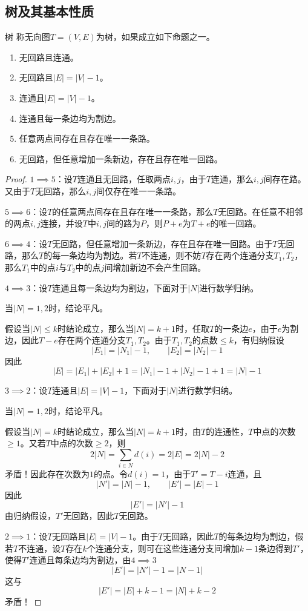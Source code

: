 \documentclass[lang = cn, scheme = chinese, thmcnt = section]{elegantbook}
\begin{document}
\subsection{树及其基本性质}

\begin{definition}{树}
	称无向图$T=(V,E)$为树，如果成立如下命题之一。
	\begin{enumerate}
		\item 无回路且连通。
		\item 无回路且$|E|=|V|-1$。
		\item 连通且$|E|=|V|-1$。
		\item 连通且每一条边均为割边。
		\item 任意两点间存在且存在唯一一条路。
		\item 无回路，但任意增加一条新边，存在且存在唯一回路。
	\end{enumerate}
\end{definition}

\begin{proof}
	$1\implies 5$：设$T$连通且无回路，任取两点$i,j$，由于$T$连通，那么$i,j$间存在路。又由于$T$无回路，那么$i,j$间仅存在唯一一条路。
	
	$5\implies 6$：设$T$的任意两点间存在且存在唯一一条路，那么$T$无回路。在任意不相邻的两点$i,j$连接，并设$T$中$i,j$间的路为$P$，则$P+e$为$T+e$的唯一回路。
	
	$6\implies 4$：设$T$无回路，但任意增加一条新边，存在且存在唯一回路。由于$T$无回路，那么$T$的每一条边均为割边。若$T$不连通，则不妨$T$存在两个连通分支$T_1,T_2$，那么$T_1$中的点$i$与$T_2$中的点$j$间增加新边不会产生回路。
	
	$4\implies 3$：设$T$连通且每一条边均为割边，下面对于$|N|$进行数学归纳。
	
	当$|N|=1,2$时，结论平凡。
	
	假设当$|N|\le k$时结论成立，那么当$|N|=k+1$时，任取$T$的一条边$e$，由于$e$为割边，因此$T-e$存在两个连通分支$T_1,T_2$。由于$T_1,T_2$的点数$\le k$，有归纳假设%
	$$
	|E_1|=|N_1|-1,\qquad
	|E_2|=|N_2|-1
	$$
	因此%
	$$
	|E|
	=|E_1|+|E_2|+1
	=|N_1|-1+|N_2|-1+1
	=|N|-1
	$$
	
	$3\implies 2$：设$T$连通且$|E|=|V|-1$，下面对于$|N|$进行数学归纳。
	
	当$|N|=1,2$时，结论平凡。
	
	假设当$|N|=k$时结论成立，那么当$|N|=k+1$时，由$T$的连通性，$T$中点的次数$\ge 1$。又若$T$中点的次数$\ge 2$，则%
	$$
	2|N|=\sum_{i\in N}d(i)=2|E|=2|N|-2
	$$
	矛盾！因此存在次数为$1$的点。令$d(i)=1$，由于$T'=T-i$连通，且%
	$$
	|N'|=|N|-1,\qquad
	|E'|=|E|-1
	$$
	因此%
	$$
	|E'|=|N'|-1
	$$
	由归纳假设，$T'$无回路，因此$T$无回路。
	
	$2\implies 1$：设$T$无回路且$|E|=|V|-1$。由于$T$无回路，因此$T$的每条边均为割边，假若$T$不连通，设$T$存在$k$个连通分支，则可在这些连通分支间增加$k-1$条边得到$T'$，使得$T'$连通且每条边均为割边，由$4\implies 3$%
	$$
	|E'|=|N'|-1=|N-1|
	$$
	这与%
	$$
	|E'|=|E|+k-1=|N|+k-2
	$$
	矛盾！
\end{proof}
\end{document}
